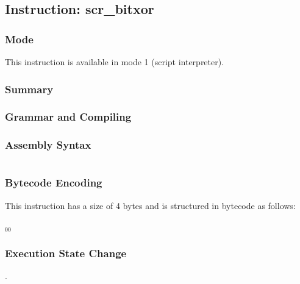 \subsection{Instruction: scr\_bitxor}

\subsubsection{Mode}
This instruction is available in mode 1 (script interpreter).
\subsubsection{Summary}


\subsubsection{Grammar and Compiling}


\subsubsection{Assembly Syntax}

\begin{myquote}
\begin{verbatim}

\end{verbatim}
\end{myquote}

\subsubsection{Bytecode Encoding}

This instruction has a size of 4 bytes and is structured in bytecode as follows:

$_{00}$\ 

\subsubsection{Execution State Change}

.


